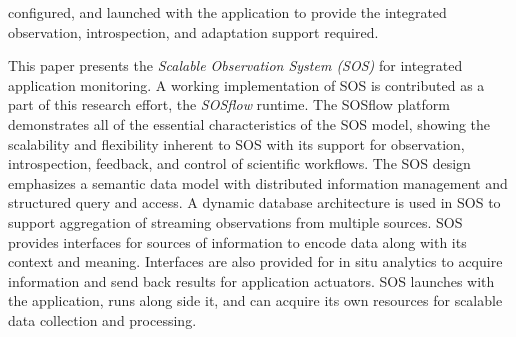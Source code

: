 configured, and launched with the application to provide the
integrated observation, introspection, and adaptation support
required.
%
\par
%
This paper presents the \textit{Scalable Observation System (SOS)} for
integrated application monitoring.
%
A working implementation of SOS is contributed as a part of this
research effort, the \textit{SOSflow} runtime.
%
The SOSflow platform demonstrates all of the essential characteristics
of the SOS model, showing the scalability and flexibility inherent to
SOS with its support for observation, introspection, feedback, and
control of scientific workflows.
%
The SOS design emphasizes a semantic data model with distributed
information management and structured query and access.
%
A dynamic database architecture is used in SOS to support aggregation
of streaming observations from multiple sources.
%
SOS provides interfaces for sources of information to encode data along
with its context and meaning.
%
Interfaces are also provided for in situ analytics to acquire
information and send back results for application actuators.
%
SOS launches with the application, runs along side it, and can acquire
its own resources for scalable data collection and processing.
%


